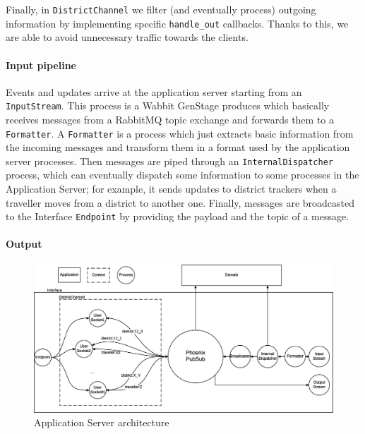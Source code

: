 Finally, in \texttt{DistrictChannel} we filter (and eventually process)
outgoing information by implementing specific \texttt{handle\_out} callbacks.
Thanks to this, we are able to avoid unnecessary traffic towards the clients.

\paragraph{Input pipeline}
Events and updates arrive at the application server starting from an
\texttt{InputStream}. This process is a Wabbit GenStage produces which
basically receives messages from a RabbitMQ topic exchange and forwards them
to a \texttt{Formatter}.
A \texttt{Formatter} is a process which just extracts basic information from
the incoming messages and transform them in a format used by the application
server processes.
Then messages are piped through an \texttt{InternalDispatcher} process, which
can eventually dispatch some information to some processes in the Application
Server; for example, it sends updates to district trackers when a traveller
moves from a district to another one.
Finally, messages are broadcasted to the Interface \texttt{Endpoint} by
providing the payload and the topic of a message.

\paragraph{Output}

\begin{figure}[H]
  \centering
  \includegraphics[width=1.1\columnwidth]{images/implementation/as-chan-pubsub.eps}
  \caption{Application Server architecture}
  \label{fig:impl-as-pubsub}
\end{figure}
